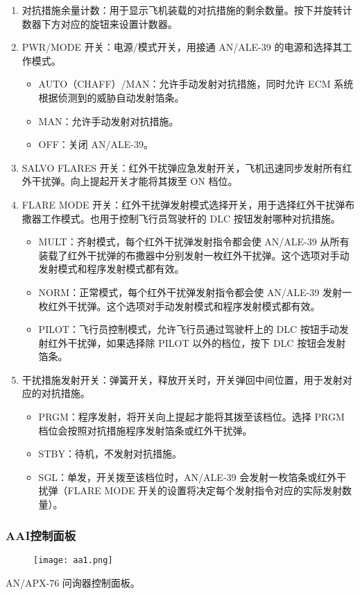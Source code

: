 \begin{enumerate}
  \item 对抗措施余量计数：用于显示飞机装载的对抗措施的剩余数量。按下并旋转计数器下方对应的旋钮来设置计数器。
  \item PWR/MODE 开关：电源/模式开关，用接通 AN/ALE-39 的电源和选择其工作模式。
  \begin{itemize}
    \item AUTO（CHAFF）/MAN：允许手动发射对抗措施，同时允许 ECM 系统根据侦测到的威胁自动发射箔条。
    \item MAN：允许手动发射对抗措施。
    \item OFF：关闭 AN/ALE-39。
  \end{itemize}
  \item SALVO FLARES 开关：红外干扰弹应急发射开关，飞机迅速同步发射所有红外干扰弹。向上提起开关才能将其拨至 ON 档位。
  \item FLARE MODE 开关：红外干扰弹发射模式选择开关，用于选择红外干扰弹布撒器工作模式。也用于控制飞行员驾驶杆的 DLC 按钮发射哪种对抗措施。
  \begin{itemize}
    \item MULT：齐射模式，每个红外干扰弹发射指令都会使 AN/ALE-39 从所有装载了红外干扰弹的布撒器中分别发射一枚红外干扰弹。这个选项对手动发射模式和程序发射模式都有效。
    \item NORM：正常模式，每个红外干扰弹发射指令都会使 AN/ALE-39 发射一枚红外干扰弹。这个选项对手动发射模式和程序发射模式都有效。
    \item PILOT：飞行员控制模式，允许飞行员通过驾驶杆上的 DLC 按钮手动发射红外干扰弹，如果选择除 PILOT 以外的档位，按下 DLC 按钮会发射箔条。
  \end{itemize}
  \item 干扰措施发射开关：弹簧开关，释放开关时，开关弹回中间位置，用于发射对应的对抗措施。
  \begin{itemize}
    \item PRGM：程序发射，将开关向上提起才能将其拨至该档位。选择 PRGM 档位会按照对抗措施程序发射箔条或红外干扰弹。
    \item STBY：待机，不发射对抗措施。
    \item SGL：单发，开关拨至该档位时，AN/ALE-39 会发射一枚箔条或红外干扰弹（FLARE MODE 开关的设置将决定每个发射指令对应的实际发射数量）。
  \end{itemize}
\end{enumerate}

\subsubsection{AAI控制面板}
\begin{figure}[htb]
  \center
  \texttt{[image: aa1.png]}
\end{figure}
AN/APX-76 问询器控制面板。

